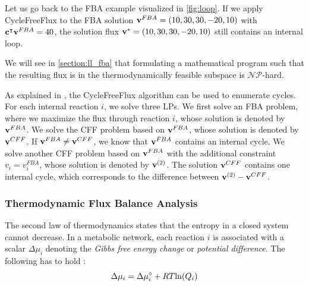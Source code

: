 Let us go back to the \textsf{FBA} example visualized in \cref{fig:loop}. If we apply \textsf{CycleFreeFlux} to the \textsf{FBA} solution $\bold v^{FBA} = (10,30,30,-20,10)$ with $\bold c^\intercal \bold v^{FBA} = 40$, the solution flux 
$\bold v^* = (10,30,30,-20,10)$ still contains an internal loop.

We will see in \cref{section:ll_fba} that formulating a mathematical program such that the resulting flux is in the thermodynamically feasible subspace is $\mathcal{NP}$-hard.

As explained in \cite{desouki_cyclefreeflux_2015-1}, the \textsf{CycleFreeFlux} algorithm can be used to enumerate cycles. For each internal reaction $i$, we solve three LPs. 
We first solve an \textsf{FBA} problem, where we maximize the flux through reaction $i$, whose solution is denoted by $\bold v^{FBA}$. We solve the \textsf{CFF} problem based on $\bold v^{FBA}$, whose solution is denoted by $\bold v^{CFF}$. If $\bold v^{FBA} \neq \bold v^{CFF}$, we know that $\bold v^{FBA}$ contains an internal cycle. We solve another \textsf{CFF} problem based on $\bold v^{FBA}$ with the additional constraint $v_i = v_i^{FBA}$, whose solution is denoted by $\bold v^{(2)}$. The solution $\bold v^{CFF}$ contains one internal cycle, which corresponds to the difference between $\bold v^{(2)} - \bold v^{CFF}$.





\subsubsection{Thermodynamic Flux Balance Analysis}
The second law of thermodynamics states that the entropy in a closed system cannot decrease. In a metabolic network, each reaction $i$ is associated with a scalar $\Delta \mu_i$ denoting the \textit{Gibbs free energy change} %
or \textit{potential difference}.
The following has to hold \cite{elimination_infeasible_loops}: 
\begin{equation*}
    \Delta \mu_i = \Delta \mu \degree_i + RT \mathrm{ln} (Q_i)
\end{equation*}


